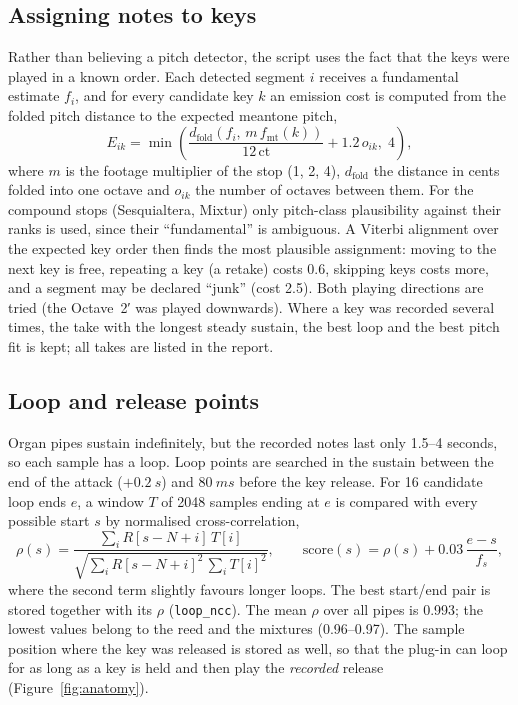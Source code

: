 \documentclass[11pt,a4paper,parskip=half,DIV=11,toc=bibliography]{scrartcl}
\newcommand{\code}[1]{\texttt{#1}}
\begin{document}
\subsection{Assigning notes to keys}
Rather than believing a pitch detector, the script uses the fact that the keys were played in a known
order. Each detected segment $i$ receives a fundamental estimate $f_i$, and for every candidate key
$k$ an emission cost is computed from the folded pitch distance to the expected meantone pitch,
\begin{equation}
 E_{ik} = \min\!\left(\frac{d_\text{fold}(f_i,\, m\, f_\text{mt}(k))}{12\,\text{ct}} + 1.2\,o_{ik},\; 4\right),
\end{equation}
where $m$ is the footage multiplier of the stop (1, 2, 4), $d_\text{fold}$ the distance in cents
folded into one octave and $o_{ik}$ the number of octaves between them. For the compound stops
(Sesquialtera, Mixtur) only pitch-class plausibility against their ranks is used, since their
\enquote{fundamental} is ambiguous. A Viterbi alignment \citep{viterbi1967} over the expected key order
then finds the most plausible assignment: moving to the next key is free, repeating a key (a retake)
costs 0.6, skipping keys costs more, and a segment may be declared \enquote{junk} (cost 2.5).
Both playing directions are tried (the Octave~2′ was played downwards). Where a key was recorded
several times, the take with the longest steady sustain, the best loop and the best pitch fit is
kept; all takes are listed in the report.

\subsection{Loop and release points}
\label{sec:loop}
Organ pipes sustain indefinitely, but the recorded notes last only 1.5--4 seconds, so each sample has a
loop. Loop points are searched in the sustain between the end of the attack ($+\SI{0.2}{s}$) and
$\SI{80}{ms}$ before the key release. For 16 candidate loop ends $e$, a window $T$ of 2048 samples ending
at $e$ is compared with every possible start $s$ by normalised cross-correlation,
\begin{equation}
 \rho(s) = \frac{\sum_i R[s-N+i]\,T[i]}{\sqrt{\sum_i R[s-N+i]^2\,\sum_i T[i]^2}},\qquad
 \text{score}(s) = \rho(s) + 0.03\,\frac{e-s}{f_s},
\end{equation}
where the second term slightly favours longer loops. The best start/end pair is stored together with
its $\rho$ (\code{loop\_ncc}). The mean $\rho$ over all pipes is 0.993; the lowest values belong to the
reed and the mixtures (0.96--0.97). The sample position where the key was released is stored as well,
so that the plug-in can loop for as long as a key is held and then play the \emph{recorded} release
(Figure~\ref{fig:anatomy}).
\end{document}
